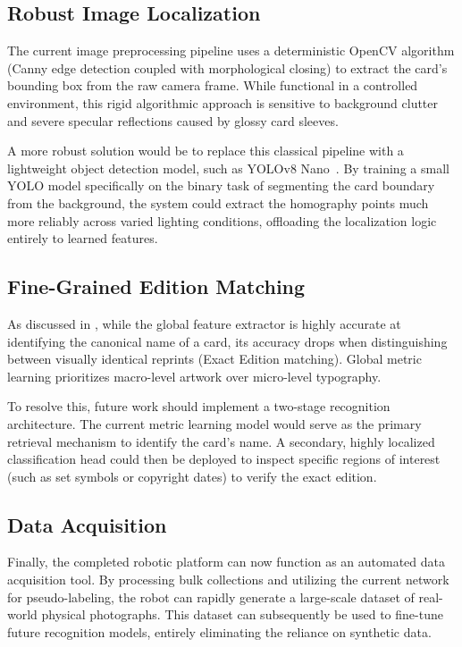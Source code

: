 \subsection{Robust Image Localization}
The current image preprocessing pipeline uses a deterministic OpenCV algorithm (Canny edge detection coupled with morphological closing) to extract the card's bounding box from the raw camera frame. While functional in a controlled environment, this rigid algorithmic approach is sensitive to background clutter and severe specular reflections caused by glossy card sleeves. 

A more robust solution would be to replace this classical pipeline with a lightweight object detection model, such as YOLOv8 Nano~\cite{redmon2016yolo}. By training a small YOLO model specifically on the binary task of segmenting the card boundary from the background, the system could extract the homography points much more reliably across varied lighting conditions, offloading the localization logic entirely to learned features.

\subsection{Fine-Grained Edition Matching}
As discussed in , while the global feature extractor is highly accurate at identifying the canonical name of a card, its accuracy drops when distinguishing between visually identical reprints (Exact Edition matching). Global metric learning prioritizes macro-level artwork over micro-level typography. 

To resolve this, future work should implement a two-stage recognition architecture. The current metric learning model would serve as the primary retrieval mechanism to identify the card's name. A secondary, highly localized classification head could then be deployed to inspect specific regions of interest (such as set symbols or copyright dates) to verify the exact edition. 

\subsection{Data Acquisition}
Finally, the completed robotic platform can now function as an automated data acquisition tool. By processing bulk collections and utilizing the current network for pseudo-labeling, the robot can rapidly generate a large-scale dataset of real-world physical photographs. This dataset can subsequently be used to fine-tune future recognition models, entirely eliminating the reliance on synthetic data.
